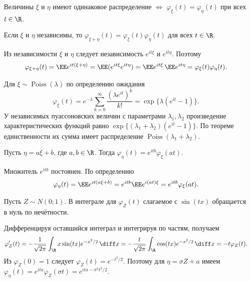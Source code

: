 \begin{theorem}
Величины $\xi$ и $\eta$ имеют одинаковое распределение
$\Leftrightarrow$ $\varphi_\xi(t)=\varphi_\eta(t)$ при всех $t\in\R$.
\end{theorem}

\begin{theorem}
Если $\xi$ и $\eta$ независимы, то
$\varphi_{\xi+\eta}(t)=\varphi_\xi(t)\varphi_\eta(t)$ для всех $t\in\R$.
\end{theorem}
\begin{Proof}
Из независимости $\xi$ и $\eta$ следует независимость $e^{it\xi}$ и $e^{it\eta}$. Поэтому
\[
 \varphi_{\xi+\eta}(t)=\EE e^{it(\xi+\eta)}
 =\EE(e^{it\xi}e^{it\eta})
 =\EE e^{it\xi}\,\EE e^{it\eta}=\varphi_\xi(t)\varphi_\eta(t).
\]
\end{Proof}

\begin{example}
Для $\xi\sim\operatorname{Poiss}(\lambda)$ по определению ожидания
\[
 \varphi_\xi(t)=e^{-\lambda}\sum_{k=0}^\infty\frac{(\lambda e^{it})^k}{k!}
 =\exp\{\lambda(e^{it}-1)\}.
\]
У независимых пуассоновских величин с параметрами $\lambda_1,\lambda_2$
произведение характеристических функций равно $\exp\{(\lambda_1+\lambda_2)(e^{it}-1)\}$.
По теореме единственности их сумма имеет распределение $\operatorname{Poiss}(\lambda_1+\lambda_2)$.
\end{example}

\begin{theorem}
Пусть $\eta=a\xi+b$, где $a,b\in\R$. Тогда
$\varphi_\eta(t)=e^{itb}\varphi_\xi(at)$.
\end{theorem}
\begin{Proof}
Множитель $e^{itb}$ постоянен. По определению
\[
 \varphi_\eta(t)=\EE e^{it(a\xi+b)}
 =e^{itb}\EE e^{i(at)\xi}=e^{itb}\varphi_\xi(at).
\]
\end{Proof}

\begin{example}
Пусть $Z\sim N(0;1)$. В интеграле для $\varphi_Z(t)$ слагаемое с $\sin(tx)$
обращается в нуль по нечётности.

\smallskip
Дифференцируя оставшийся интеграл и
интегрируя по частям, получаем
\[
 \varphi_Z'(t)=-\frac1{\sqrt{2\pi}}\int_{\R} x\sin(tx)e^{-x^2/2}\,\diff x
 =-\frac{t}{\sqrt{2\pi}}\int_{\R}\cos(tx)e^{-x^2/2}\,\diff x
 =-t\varphi_Z(t).
\]
Из $\varphi_Z(0)=1$ следует $\varphi_Z(t)=e^{-t^2/2}$.
Поэтому для $\eta=\sigma Z+a$ имеем
$\varphi_\eta(t)=e^{ita}\varphi_Z(\sigma t)=e^{ita-\sigma^2t^2/2}$.
\end{example}

